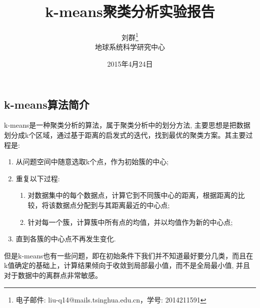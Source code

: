 \documentclass[a4paper, 1pt]{article}
\newcommand{\xiaosihao}{\fontsize{12pt}{\baselineskip}\selectfont}
\newcommand{\wuhao}{\fontsize{10.5pt}{\baselineskip}\selectfont}
\newcommand{\xiaowuhao}{\fontsize{9pt}{\baselineskip}\selectfont}
\begin{document}
\begin{spacing}{1.0}

\title{k-means聚类分析实验报告}
\author{\wuhao 刘群\footnote{电子邮件: liu-q14@mails.tsinghua.edu.cn，学号: 2014211591}\\[2ex]
\wuhao 地球系统科学研究中心\\
}
\date{\wuhao 2015年4月24日}
\maketitle

\xiaowuhao 
\section{\xiaosihao k-means算法简介}
k-means是一种聚类分析的算法，属于聚类分析中的划分方法, 主要思想是把数据划分成k个区域，通过基于距离的启发式的迭代，找到最优的聚类方案。其主要过程是:
\begin{enumerate}
\item 从问题空间中随意选取k个点，作为初始簇的中心;
\item  重复以下过程:
\begin{enumerate}
\item 对数据集中的每个数据点，计算它到不同簇中心的距离，根据距离的比较，将该数据点分配到与其距离最近的中心点;
\item 针对每一个簇，计算簇中所有点的均值，并以均值作为新的中心点;
\end{enumerate}
\item 直到各簇的中心点不再发生变化.
\end{enumerate}

但是k-means也有一些问题，即在初始条件下我们并不知道最好要分几类，而且在k值确定的基础上，计算结果倾向于收敛到局部最小值，而不是全局最小值, 并且对于数据中的离群点非常敏感。


\end{spacing}
\end{document}
